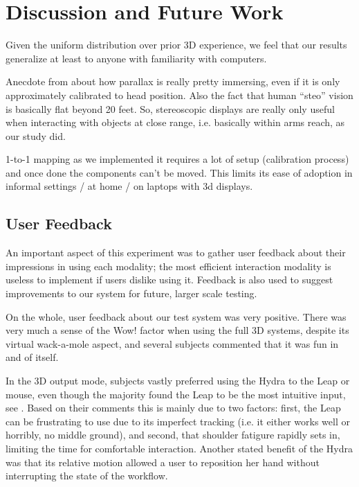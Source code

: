 \section{Discussion and Future Work}\label{sec:discussion}

Given the uniform distribution over prior 3D experience, we feel that our
results generalize at least to anyone with familiarity with computers.

Anecdote from \cite{leewii} about how parallax is really pretty immersing,
even if it is only approximately calibrated to head position.  Also the fact
that human ``steo'' vision is basically flat beyond 20 feet.  So, stereoscopic
displays are really only useful when interacting with objects at close range,
i.e. basically within arms reach, as our study did.

1-to-1 mapping as we implemented it requires a lot of setup (calibration process) and once done the components can't be moved.  This limits its ease of adoption in informal settings / at home / on laptops with 3d displays.

\subsection{User Feedback}\label{sec:feedback}

An important aspect of this experiment was to gather user feedback about their
impressions in using each modality; the most efficient interaction modality is
useless to implement if users dislike using it.  Feedback is also used to
suggest improvements to our system for future, larger scale testing.

On the whole, user feedback about our test system was very positive.  There
was very much a sense of the Wow! factor when using the full 3D systems,
despite its virtual wack-a-mole aspect, and several subjects commented that it
was fun in and of itself.

In the 3D output mode, subjects vastly preferred using the Hydra to the Leap
or mouse, even though the majority found the Leap to be the most intuitive
input, see .  Based on their comments this is mainly due to
two factors: first, the Leap can be frustrating to use due to its imperfect
tracking (i.e. it either works well or horribly, no middle ground), and
second, that shoulder fatigure rapidly sets in, limiting the time for
comfortable interaction.  Another stated benefit of the Hydra was that its
relative motion allowed a user to reposition her hand without interrupting the
state of the workflow.

